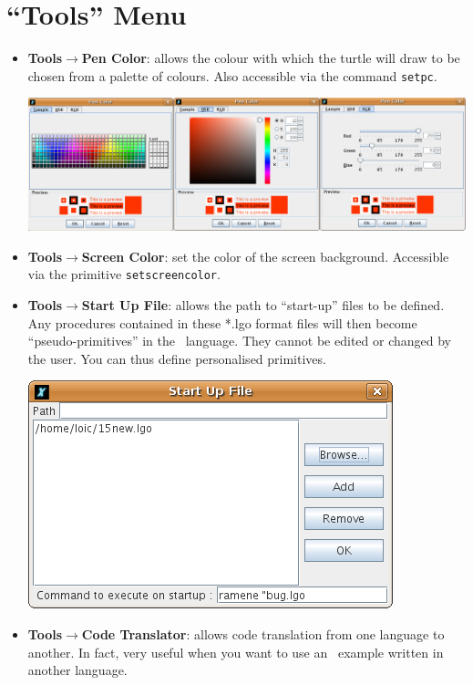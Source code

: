 \section{``Tools'' Menu}
\begin{itemize}
 \item \textbf{Tools$\to$Pen Color}: allows the colour with which the turtle will draw to be chosen from a palette of colours. Also accessible
via the command \texttt{setpc}.
\begin{center}
 \includegraphics[scale=0.3]{pics/interface-CaptureColor.png}
\end{center}
\vspace{0.25cm}
\item \textbf{Tools$\to$Screen Color}: set the color of the screen background. Accessible via the primitive \texttt{setscreencolor}.\\
\item \textbf{Tools$\to$Start Up File}: allows the path to {}``start-up'' files to be defined. Any procedures contained in these {*}.lgo format
files will then become {}``pseudo-primitives'' in the \xlogo\ language. They cannot be edited or changed by the user. You can thus define
personalised primitives. 
\begin{center}
 \includegraphics[scale=0.4]{pics/interface-CaptureStart.png}
\end{center}
\vspace{0.25cm}
\item \textbf{Tools$\to$Code Translator}: allows code translation from one language to another. In fact, very useful when you want to use an \xlogo\ example written in another language.

\end{itemize}
